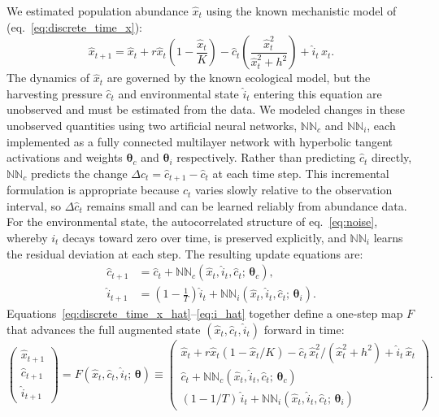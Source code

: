 \documentclass[openacc]{rsproca_new}%
\newcommand{\bs}[1]{\boldsymbol{#1}}
\begin{document}
We estimated population abundance $\hat{x}_t$ using the known mechanistic
model of \textcite{Tilman2024} (eq.~\eqref{eq:discrete_time_x}):
%
\begin{equation}
    \hat{x}_{t+1}
        = \hat{x}_t
        + r\hat{x}_t\!\left(1 - \frac{\hat{x}_t}{K}\right)
        - \hat{c}_t\left(\frac{\hat{x}_t^2}{\hat{x}_t^2 + h^2}\right)
        + \hat{i}_t\,\hat{x}_t .
    \label{eq:discrete_time_x_hat}
\end{equation}
%
The dynamics of $\hat{x}_t$ are governed by the known ecological model, but the harvesting pressure $\hat{c}_t$ and environmental state $\hat{i}_t$ entering this equation are unobserved and must be estimated from the data. We modeled changes in these unobserved quantities using two artificial neural networks, $\mathbb{NN}_c$ and $\mathbb{NN}_i$, each implemented as a fully connected multilayer network with hyperbolic tangent activations and weights $\bs{\theta}_c$ and $\bs{\theta}_i$ respectively.
Rather than predicting $\hat{c}_t$ directly, $\mathbb{NN}_c$ predicts the change $\Delta\hat{c}_t = \hat{c}_{t+1} - \hat{c}_t$ at each time step. This incremental formulation is appropriate because $c_t$ varies slowly relative to the observation interval, so $\Delta\hat{c}_t$ remains small and can be learned reliably from abundance data. For the environmental state, the autocorrelated structure of eq.~\eqref{eq:noise}, whereby $i_t$ decays toward zero over time, is preserved explicitly, and $\mathbb{NN}_i$ learns the residual deviation at each step. The resulting update equations are:
%
\begin{align}
    \hat{c}_{t+1}
        &= \hat{c}_t
           + \mathbb{NN}_c(\hat{x}_t, \hat{i}_t, \hat{c}_t;\,\bs{\theta}_c),
    \label{eq:c_hat} \\
    \hat{i}_{t+1}
        &= \left(1 - \frac{1}{T}\right)\hat{i}_t
           + \mathbb{NN}_i(\hat{x}_t, \hat{i}_t, \hat{c}_t;\,\bs{\theta}_i).
    \label{eq:i_hat}
\end{align}
%
Equations~\eqref{eq:discrete_time_x_hat}--\eqref{eq:i_hat} together define a one-step map $F$ that advances the full augmented state $(\hat{x}_t, \hat{c}_t, \hat{i}_t)$ forward in time:
%
\begin{equation}
    \begin{pmatrix} \hat{x}_{t+1} \\ \hat{c}_{t+1} \\ \hat{i}_{t+1} \end{pmatrix}
    = F\!\left(\hat{x}_t, \hat{c}_t, \hat{i}_t;\, \bs{\theta}\right)
    \equiv
    \begin{pmatrix}
        \hat{x}_t + r\hat{x}_t(1 - \hat{x}_t/K)
            - \hat{c}_t\,\hat{x}_t^2/(\hat{x}_t^2+h^2)
            + \hat{i}_t\,\hat{x}_t \\[4pt]
        \hat{c}_t + \mathbb{NN}_c(\hat{x}_t,\hat{i}_t,\hat{c}_t;\,\bs{\theta}_c) \\[4pt]
        (1-1/T)\,\hat{i}_t + \mathbb{NN}_i(\hat{x}_t,\hat{i}_t,\hat{c}_t;\,\bs{\theta}_i)
    \end{pmatrix}.
    \label{eq:F_map}
\end{equation}
\end{document}
